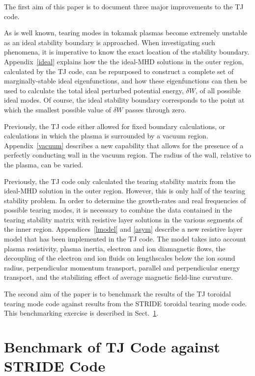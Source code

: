 \documentclass[12pt,prb,aps]{revtex4-1}
\begin{document}
The first aim of this paper is to document three major improvements to the TJ code. 

As is well known, tearing modes in tokamak plasmas become extremely
unstable as an ideal stability boundary is approached.\cite{brennan,bren1,bren2} When investigating such phenomena, it is imperative to know the exact location
of the  stability boundary. Appendix~\ref{ideal} explains how the the ideal-MHD solutions in the outer region, calculated by the TJ code, can be repurposed to
construct a complete set of marginally-stable ideal eigenfunctions, and how these eigenfunctions can then be used to calculate the total ideal perturbed potential
energy, $\delta W$, of all possible ideal modes.  Of course, the ideal stability boundary corresponds to the point at which the smallest possible value of $\delta W$ passes through
zero.\cite{freidberg,ideal}

Previously, the TJ code either allowed for fixed boundary calculations, or calculations in which the plasma is surrounded by a vacuum region. Appendix~\ref{vacuum} describes a
new capability that allows for the presence of a perfectly conducting wall in the vacuum region. The radius of the wall, relative to the plasma, can be varied. 

Previously, the TJ code only calculated the tearing stability matrix from the ideal-MHD solution in the outer region. However, this is only half of the tearing stability problem. 
In order to determine the growth-rates and real frequencies of possible tearing modes, it is necessary to combine the data contained in the tearing stability matrix with resistive layer solutions
in the various segments of the inner region. Appendices~\ref{lmodel} and \ref{asym}   describe a new resistive layer model that has been implemented in the TJ code. The model takes into account 
plasma resistivity, plasma inertia, electron and ion diamagnetic flows, the decoupling of the electron and ion fluids on lengthscales below the ion sound radius, perpendicular
momentum transport, parallel and perpendicular energy transport, and the stabilizing effect of average magnetic field-line curvature.

The second aim of the paper is to benchmark the results of the TJ toroidal tearing mode code against results from the STRIDE toroidal tearing mode code. This benchmarking
exercise is described in Sect.~\ref{benchmark}. 

\section{Benchmark of TJ Code against STRIDE Code}\label{benchmark}
\end{document}
